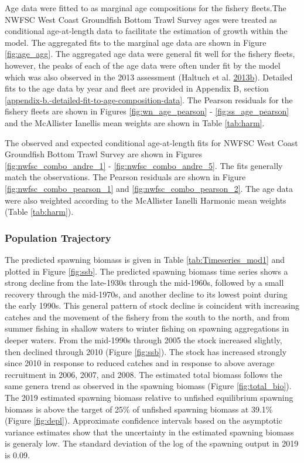 \documentclass[12pt,]{article}
\begin{document}
Age data were fitted to as marginal age compositions for the fishery
fleets.The NWFSC West Coast Groundfish Bottom Trawl Survey ages were
treated as conditional age-at-length data to facilitate the estimation
of growth within the model. The aggregated fits to the marginal age data
are shown in Figure \ref{fig:age_agg}. The aggregated age data were
general fit well for the fishery fleets, however, the peaks of each of
the age data were often under fit by the model which was also observed
in the 2013 assessment (Haltuch et al.
\protect\hyperlink{ref-haltuch_status_2013}{2013}\protect\hyperlink{ref-haltuch_status_2013}{b}).
Detailed fits to the age data by year and fleet are provided in Appendix
B, section \ref{appendix-b.-detailed-fit-to-age-composition-data}. The
Pearson residuals for the fishery fleets are shown in Figures
\ref{fig:wn_age_pearson} - \ref{fig:ss_age_pearson} and the McAllister
Ianellis mean weights are shown in Table \ref{tab:harm}.

The observed and expected conditional age-at-length fits for NWFSC West
Coast Groundfish Bottom Trawl Survey are shown in Figures
\ref{fig:nwfsc_combo_andre_1} - \ref{fig:nwfsc_combo_andre_5}. The fits
generally match the observations. The Pearson residuals are shown in
Figure \ref{fig:nwfsc_combo_pearson_1} and
\ref{fig:nwfsc_combo_pearson_2}. The age data were also weighted
according to the McAllister Ianelli Harmonic mean weights (Table
\ref{tab:harm}).

\subsubsection{Population Trajectory}\label{population-trajectory}

The predicted spawning biomass is given in Table
\ref{tab:Timeseries_mod1} and plotted in Figure \ref{fig:ssb}. The
predicted spawning biomass time series shows a strong decline from the
late-1930s through the mid-1960s, followed by a small recovery through
the mid-1970s, and another decline to its lowest point during the early
1990s. This general pattern of stock decline is coincident with
increasing catches and the movement of the fishery from the south to the
north, and from summer fishing in shallow waters to winter fishing on
spawning aggregations in deeper waters. From the mid-1990s through 2005
the stock increased slightly, then declined through 2010 (Figure
\ref{fig:ssb}). The stock has increased strongly since 2010 in response
to reduced catches and in response to above average recruitment in 2006,
2007, and 2008. The estimated total biomass follows the same genera
trend as observed in the spawning biomass (Figure \ref{fig:total_bio}).
The 2019 estimated spawning biomass relative to unfished equilibrium
spawning biomass is above the target of 25\% of unfished spawning
biomass at 39.1\% (Figure \ref{fig:depl}). Approximate confidence
intervals based on the asymptotic variance estimates show that the
uncertainty in the estimated spawning biomass is generaly low. The
standard deviation of the log of the spawning output in 2019 is 0.09.
\end{document}
